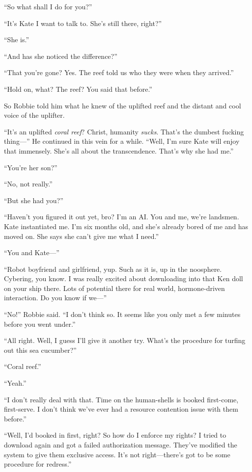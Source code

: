 “So what shall I do for you?”

“It’s Kate I want to talk to. She’s still there, right?”

“She is.”

“And has she noticed the difference?”

“That you’re gone? Yes. The reef told us who they were when they
arrived.”

“Hold on, what? The reef? You said that before.”

So Robbie told him what he knew of the uplifted reef and the
distant and cool voice of the uplifter.

“It’s an uplifted \emph{coral reef}? Christ, humanity \emph{sucks}.
That’s the dumbest fucking thing—” He continued in this vein for a
while. “Well, I’m sure Kate will enjoy that immensely. She’s all
about the transcendence. That’s why she had me.”

“You’re her son?”

“No, not really.”

“But she had you?”

“Haven’t you figured it out yet, bro? I’m an AI. You and me, we’re
landsmen. Kate instantiated me. I’m six months old, and she’s
already bored of me and has moved on. She says she can’t give me
what I need.”

“You and Kate—”

“Robot boyfriend and girlfriend, yup. Such as it is, up in the
noosphere. Cybering, you know. I was really excited about
downloading into that Ken doll on your ship there. Lots of
potential there for real world, hormone-driven interaction. Do you
know if we—”

“No!” Robbie said. “I don’t think so. It seems like you only met a
few minutes before you went under.”

“All right. Well, I guess I’ll give it another try. What’s the
procedure for turfing out this sea cucumber?”

“Coral reef.”

“Yeah.”

“I don’t really deal with that. Time on the human-shells is booked
first-come, first-serve. I don’t think we’ve ever had a resource
contention issue with them before.”

“Well, I’d booked in first, right? So how do I enforce my rights? I
tried to download again and got a failed authorization message.
They’ve modified the system to give them exclusive access. It’s not
right—there’s got to be some procedure for redress.”

